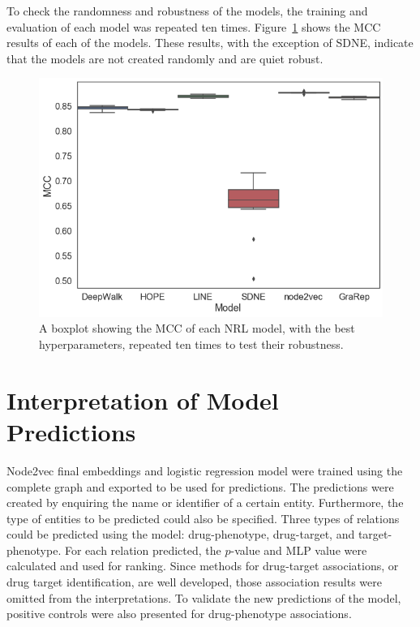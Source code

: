 To check the randomness and robustness of the models, the training and evaluation of each model was repeated ten times.
Figure~\ref{fig:boxplot} shows the \ac{MCC} results of each of the models.
These results, with the exception of SDNE, indicate that the models are not created randomly and are quiet robust.

\begin{figure}[h!]
    \centering
    \includegraphics[scale=0.4]
    {figures/boxplot.png}
    \caption[Boxplot of the robustness of NRL models]{\label{fig:boxplot} A boxplot showing the MCC of each NRL model, with the best hyperparameters, repeated ten times to test their robustness.}
\end{figure}

\section{Interpretation of Model Predictions}

Node2vec final embeddings and logistic regression model were trained using the complete graph and exported to be used for predictions.
The predictions were created by enquiring the name or identifier of a certain entity.
Furthermore, the type of entities to be predicted could also be specified.
Three types of relations could be predicted using the model: drug-phenotype, drug-target, and target-phenotype.
For each relation predicted, the $p$-value and \ac{MLP} value were calculated and used for ranking.
Since methods for drug-target associations, or drug target identification, are well developed, those association results were omitted from the interpretations.
To validate the new predictions of the model, positive controls were also presented for drug-phenotype associations.

